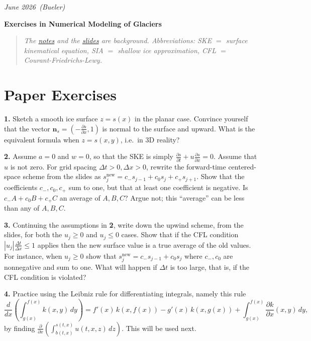 \documentclass[12pt]{amsart}
\newcommand{\bn}{\mathbf{n}}
\newcommand{\prob}[1]{\medskip\noindent\textbf{#1.}\quad }
\begin{document}
\scriptsize \hfill \emph{June 2026\, (Bueler)}
\normalsize\medskip

\large\centerline{\textbf{Exercises in Numerical Modeling of Glaciers}}
\medskip

\normalsize
\begin{quote}
\emph{The \href{https://github.com/bueler/mccarthy/tree/master/notes/notes-2026.pdf}{notes} and the \href{https://github.com/bueler/mccarthy/tree/master/slides/slides-2026.pdf}{slides} are background.  Abbreviations: SKE $=$ surface kinematical equation, SIA $=$ shallow ice approximation, CFL $=$ Courant-Friedrichs-Lewy.}
\end{quote}
\medskip
\thispagestyle{empty}

\section*{Paper Exercises}

\vspace{-2mm}
\prob{1}  Sketch a smooth ice surface $z=s(x)$ in the planar case.  Convince yourself that the vector $\bn_s = (-\frac{\partial s}{\partial x},1)$ is normal to the surface and upward.  What is the equivalent formula when $z=s(x,y)$, i.e.~in 3D reality?

\prob{2}  Assume $a=0$ and $w=0$, so that the SKE is simply $\frac{\partial s}{\partial t} + u \frac{\partial s}{\partial x} = 0$.  Assume that $u$ is not zero.  For grid spacing $\Delta t>0,\Delta x>0$, rewrite the forward-time centered-space scheme from the slides as $s_j^{\text{new}} = c_{-} s_{j-1} + c_0 s_j + c_{+} s_{j+1}$.  Show that the coefficients $c_{-},c_0,c_{+}$ sum to one, but that at least one coefficient is negative.  Is $c_{-} A + c_0 B + c_{+} C$ an average of $A,B,C$?  Argue not; this ``average'' can be less than any of $A,B,C$.

\prob{3}  Continuing the assumptions in \textbf{2}, write down the upwind scheme, from the slides, for both the $u_j\ge 0$ and $u_j\le 0$ cases.  Show that if the CFL condition $|u_j| \frac{\Delta t}{\Delta x} \le 1$ applies then the new surface value is a true average of the old values.  For instance, when $u_j\ge 0$ show that $s_j^{\text{new}} = c_{-} s_{j-1} + c_0 s_j$ where $c_{-},c_0$ are nonnegative and sum to one.  What will happen if $\Delta t$ is too large, that is, if the CFL condition is violated?

\prob{4}  Practice using the Leibniz rule for differentiating integrals, namely this rule
  $$\frac{d}{dx}\left(\int_{g(x)}^{f(x)} k(x,y)\,dy\right) = f'(x)\, k(x,f(x)) - g'(x)\, k(x,g(x)) + \int_{g(x)}^{f(x)} \frac{\partial k}{\partial x}(x,y)\,dy,$$
by finding $\frac{\partial}{\partial x} \left(\int_{b(t,x)}^{s(t,x)} u(t,x,z)\,dz\right)$.  This will be used next.
\end{document}
